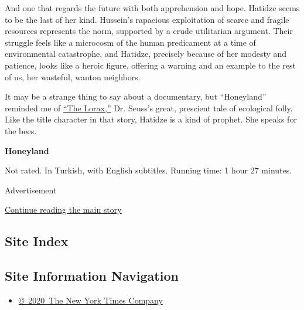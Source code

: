 And one that regards the future with both apprehension and hope. Hatidze
seems to be the last of her kind. Hussein's rapacious exploitation of
scarce and fragile resources represents the norm, supported by a crude
utilitarian argument. Their struggle feels like a microcosm of the human
predicament at a time of environmental catastrophe, and Hatidze,
precisely because of her modesty and patience, looks like a heroic
figure, offering a warning and an example to the rest of us, her
wasteful, wanton neighbors.

It may be a strange thing to say about a documentary, but ``Honeyland''
reminded me of
\href{https://www.nytimes.com/1984/12/10/us/speaking-for-the-trees.html}{``The
Lorax,''} Dr. Seuss's great, prescient tale of ecological folly. Like
the title character in that story, Hatidze is a kind of prophet. She
speaks for the bees.

\textbf{Honeyland}

Not rated. In Turkish, with English subtitles. Running time: 1 hour 27
minutes.

Advertisement

\protect\hyperlink{after-bottom}{Continue reading the main story}

\hypertarget{site-index}{%
\subsection{Site Index}\label{site-index}}

\hypertarget{site-information-navigation}{%
\subsection{Site Information
Navigation}\label{site-information-navigation}}

\begin{itemize}
\tightlist
\item
  \href{https://help.nytimes.com/hc/en-us/articles/115014792127-Copyright-notice}{©~2020~The
  New York Times Company}
\end{itemize}

